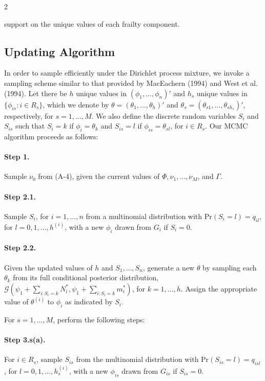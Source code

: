 \documentclass[10pt, letterpaper]{article}
\newcommand{\Gdist}{\mathcal{G}} %
\begin{document}
\vfill
\centerline{2}
\clearpage %

support on the unique values of each frailty component.

\subsection*{Updating Algorithm}

In order to sample efficiently under the Dirichlet process mixture, we invoke a sampling scheme similar to that provided by MacEachern (1994) and West et al. (1994). Let there be $h$ unique values in $(\phi_1, \dots, \phi_n)'$ and $h_s$ unique values in $\{ \phi_{is} : i \in R_s \}$, which we denote by $\theta = (\theta_1, \dots, \theta_h)'$ and $\theta_s = (\theta_{s1}, \dots, \theta_{sh_s})'$, respectively, for $s=1, \dots, M$. We also define the discrete random variables $S_i$ and $S_{is}$ such that $S_i = k$ if $\phi_i = \theta_k$ and $S_{is} = l$ if $\phi_{is} = \theta_{sl}$, for $i \in R_s$. Our MCMC algorithm proceeds as follows:

\paragraph{Step 1.} Sample $\nu_0$ from (A-4), given the current values of $\Phi, \nu_1, \dots, \nu_M$, and $\Gamma$.

\paragraph{Step 2.1.} Sample $S_i$, for $i=1, \dots, n$ from a multinomial distribution with Pr$(S_i = l) = q_{il}$, for $l=0, 1, \dots, h^{(i)}$, with a new $\phi_i$ drawn from $G_i$ if $S_i = 0$.

\paragraph{Step 2.2.} Given the updated values of $h$ and $S_1, \dots, S_n$, generate a new $\theta$ by sampling each $\theta_k$ from its full conditional posterior distribution, $\Gdist(\psi_1 + \sum_{i:S_i=k} N_i^*, \psi_1 + \sum_{i:S_i=k} m_i^*)$, for $k=1, \dots, h$. Assign the appropriate value of $\theta^{(i)}$ to $\phi_i$ as indicated by $S_i$.

For $s=1, \dots, M$, perform the following steps:

\paragraph{Step 3.s(a).} For $i \in R_s$, sample $S_{is}$ from the multinomial distribution with Pr$(S_{is} = l) = q_{isl}$, for $l=0, 1, \dots, h_s^{(i)}$, with a new $\phi_{is}$ drawn from $G_{is}$ if $S_{is} = 0$.
\end{document}

